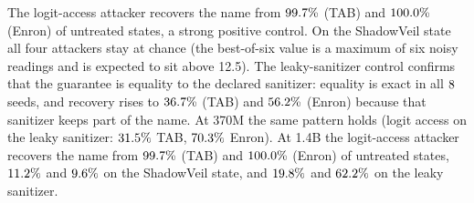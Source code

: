 \documentclass[conference]{IEEEtran}
\begin{document}
\begin{table}[t]
\caption{Four attackers on untreated, ShadowVeil (class-independent sanitizer) and a leaky sanitizer that keeps three characters of
the name; identity accuracy (\%, 130M, mean of eight seeds, chance 12.5). Bitwise equality to the declared sanitized stream holds in
every run, for both sanitizers.}
\label{tab:attackers}
\centering
{}
\end{table}

The logit-access attacker recovers the name from $99.7\%$ (TAB) and $100.0\%$ (Enron) of untreated
states, a strong positive control. On the ShadowVeil state all four attackers stay at chance (the best-of-six value is a maximum of
six noisy readings and is expected to sit above 12.5). The leaky-sanitizer control confirms that the guarantee is equality to the declared
sanitizer: equality is exact in all $8$ seeds, and recovery rises to $36.7\%$ (TAB) and $56.2\%$ (Enron)
because that sanitizer keeps part of the name. At 370M the same pattern holds
(logit access on the leaky sanitizer: $31.5\%$ TAB, $70.3\%$ Enron). At 1.4B the logit-access attacker recovers
the name from $99.7\%$ (TAB) and $100.0\%$ (Enron) of untreated states, $11.2\%$ and
$9.6\%$ on the ShadowVeil state, and $19.8\%$ and $62.2\%$ on the leaky sanitizer.
\end{document}
